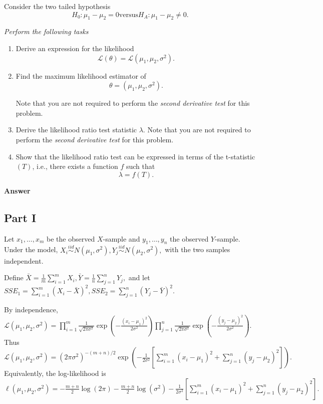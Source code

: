 \documentclass[letterpaper]{article}
\begin{document}
		\medskip
		
		Consider the two tailed hypothesis
		\[
		H_0 : \mu_1 - \mu_2 = 0 
		\text{versus} 
		H_A : \mu_1 - \mu_2 \neq 0 .
		\]
		
		\medskip
		
		\emph{Perform the following tasks}
		
		\begin{enumerate}
			
			\item[i] Derive an expression for the likelihood
			\[
			\mathcal{L}(\theta) = \mathcal{L}(\mu_1,\mu_2,\sigma^2).
			\]
			
			\item[ii] Find the maximum likelihood estimator of
			\[
			\theta = (\mu_1,\mu_2,\sigma^2).
			\]
			
			Note that you are not required to perform the \emph{second derivative test} for this problem.
			
			\item[iii] Derive the likelihood ratio test statistic $\lambda$. Note that you are not required to perform the \emph{second derivative test} for this problem.
			
			\item[iv] Show that the likelihood ratio test can be expressed in terms of the t-statistic $(T)$, i.e., there exists a function $f$ such that
			\[
			\lambda = f(T).
			\]
			
		\end{enumerate}
		
		\textbf{Answer}
		
		\subsection{Part I}
		
		Let $x_1,\dots,x_m$ be the observed $X$-sample and $y_1,\dots,y_n$ the observed $Y$-sample. Under the model,
		$
		X_i \stackrel{iid}{\sim} N(\mu_1,\sigma^2), 
		Y_j \stackrel{iid}{\sim} N(\mu_2,\sigma^2),
		$
		with the two samples independent.
		
		Define
		$
		\bar X=\frac1m\sum_{i=1}^m X_i, 
		\bar Y=\frac1n\sum_{j=1}^n Y_j,
		$
		and let
		$
		SSE_1=\sum_{i=1}^m (X_i-\bar X)^2, 
		SSE_2=\sum_{j=1}^n (Y_j-\bar Y)^2.
		$
		
		
		By independence,
		$
		\mathcal L(\mu_1,\mu_2,\sigma^2)
		=
		\prod_{i=1}^m \frac{1}{\sqrt{2\pi\sigma^2}}
		\exp\!\left(-\frac{(x_i-\mu_1)^2}{2\sigma^2}\right)
		\prod_{j=1}^n \frac{1}{\sqrt{2\pi\sigma^2}}
		\exp\!\left(-\frac{(y_j-\mu_2)^2}{2\sigma^2}\right).
		$
		Thus
		$
		\mathcal L(\mu_1,\mu_2,\sigma^2)
		=
		(2\pi\sigma^2)^{-(m+n)/2}
		\exp\!\left(
		-\frac{1}{2\sigma^2}
		\left[
		\sum_{i=1}^m (x_i-\mu_1)^2+\sum_{j=1}^n (y_j-\mu_2)^2
		\right]
		\right).
		$
		Equivalently, the log-likelihood is
		$
		\ell(\mu_1,\mu_2,\sigma^2)
		=
		-\frac{m+n}{2}\log(2\pi)
		-\frac{m+n}{2}\log(\sigma^2)
		-\frac{1}{2\sigma^2}
		\left[
		\sum_{i=1}^m (x_i-\mu_1)^2+\sum_{j=1}^n (y_j-\mu_2)^2
		\right].
		$
		
\end{document}
